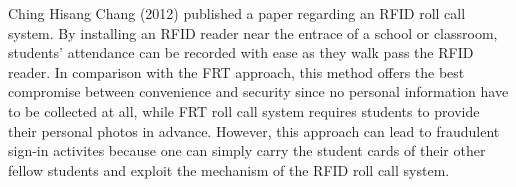 Ching Hisang Chang (2012) published a paper \cite{chc-2012} regarding an RFID roll call system.
By installing an RFID reader near the entrace of a school or classroom, students' attendance
can be recorded with ease as they walk pass the RFID reader. In comparison with the FRT approach,
this method offers the best compromise between convenience and security since no personal information
have to be collected at all, while FRT roll call system requires students to provide their personal
photos in advance. However, this approach can lead to fraudulent sign-in activites because
one can simply carry the student cards of their other fellow students and exploit the mechanism
of the RFID roll call system.

